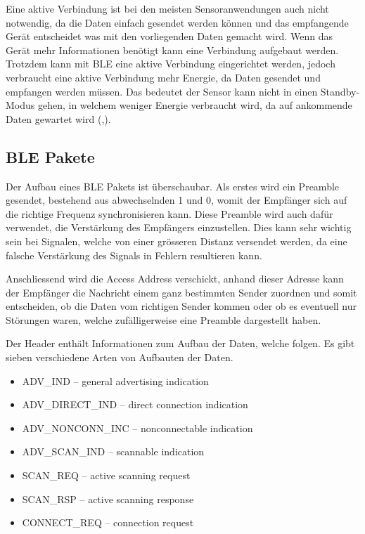 Eine aktive Verbindung ist bei den meisten Sensoranwendungen auch nicht notwendig, da die Daten einfach gesendet werden können und das empfangende Gerät entscheidet was mit den vorliegenden Daten gemacht wird. Wenn das Gerät mehr Informationen benötigt kann eine Verbindung aufgebaut werden. Trotzdem kann mit BLE eine aktive Verbindung eingerichtet werden, jedoch verbraucht eine aktive Verbindung mehr Energie, da Daten gesendet und empfangen werden müssen. Das bedeutet der Sensor kann nicht in einen Standby- Modus gehen, in welchem weniger Energie verbraucht wird, da auf ankommende Daten gewartet wird (\cite{BLE_advertising},\cite{ELKO_BLE}).

\subsection{BLE Pakete}

Der Aufbau eines BLE Pakets ist überschaubar. Als erstes wird ein Preamble gesendet, bestehend aus abwechselnden 1 und 0, womit der Empfänger sich auf die richtige Frequenz synchronisieren kann. Diese Preamble wird auch dafür verwendet, die Verstärkung des Empfängers einzustellen. Dies kann sehr wichtig sein bei Signalen, welche von einer grösseren Distanz versendet werden, da eine falsche Verstärkung des Signals in Fehlern resultieren kann.

Anschliessend wird die Access Address verschickt, anhand dieser Adresse kann der Empfänger die Nachricht einem ganz bestimmten Sender zuordnen und somit entscheiden, ob die Daten vom richtigen Sender kommen oder ob es eventuell nur Störungen waren, welche zufälligerweise eine Preamble dargestellt haben.

Der Header enthält Informationen zum Aufbau der Daten, welche folgen. Es gibt sieben verschiedene Arten von Aufbauten der Daten.

\begin{itemize}
    \item ADV\_IND – general advertising indication
    \item ADV\_DIRECT\_IND – direct connection indication
    \item ADV\_NONCONN\_INC – nonconnectable indication
    \item ADV\_SCAN\_IND – scannable indication
    \item SCAN\_REQ – active scanning request
    \item SCAN\_RSP – active scanning response
    \item CONNECT\_REQ – connection request
\end{itemize}

